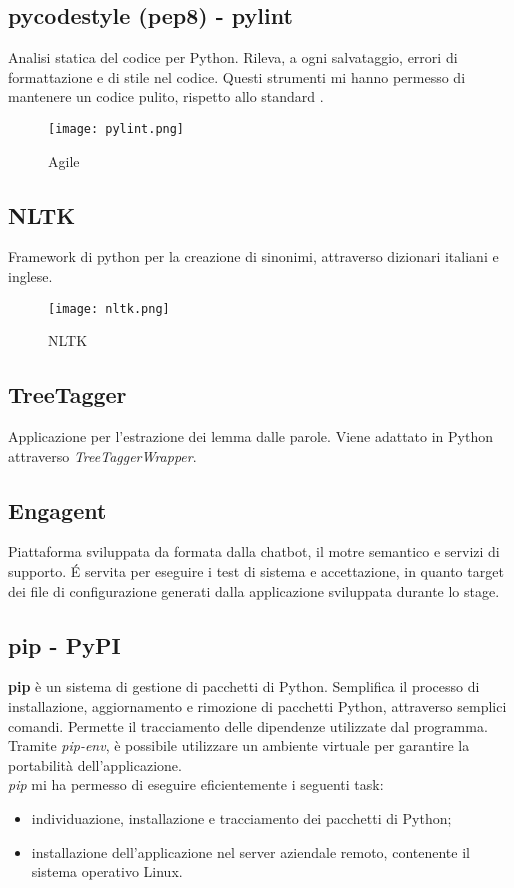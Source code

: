 \subsection*{pycodestyle (pep8) - pylint}
Analisi statica del codice per Python. Rileva, a ogni salvataggio, errori di formattazione e di stile nel codice. Questi strumenti mi hanno permesso di mantenere un codice pulito, rispetto allo standard . 
\begin{figure}[H]
    \centering
    \texttt{[image: pylint.png]} 
    \caption{Agile}
    \label{logo:company}
\end{figure}

\subsection*{NLTK}
Framework di python per la creazione di sinonimi, attraverso dizionari italiani e inglese.
\begin{figure}[H]
    \centering
    \texttt{[image: nltk.png]} 
    \caption{NLTK}
    \label{logo:company}
\end{figure}

\subsection*{TreeTagger}
Applicazione per l'estrazione dei lemma dalle parole. Viene adattato in Python attraverso \textit{TreeTaggerWrapper}.

\subsection*{Engagent}
Piattaforma sviluppata da {\company{}} formata dalla chatbot, il motre semantico e servizi di supporto. \'E servita per eseguire i test di sistema e accettazione, in quanto target dei file di configurazione generati dalla applicazione sviluppata durante lo stage.

\subsection{pip - PyPI}
\textbf{pip} è un sistema di gestione di pacchetti di Python. Semplifica il processo di installazione, aggiornamento e rimozione di pacchetti Python, attraverso semplici comandi. Permette il tracciamento delle dipendenze utilizzate dal programma. Tramite \textit{pip-env}, è possibile utilizzare un ambiente virtuale per garantire la portabilità dell'applicazione.\\
\textit{pip} mi ha permesso di eseguire eficientemente i seguenti task:
\begin{itemize}
    \item individuazione, installazione e tracciamento dei pacchetti di Python;
    \item installazione dell'applicazione nel server aziendale remoto, contenente il sistema operativo Linux.
\end{itemize}

